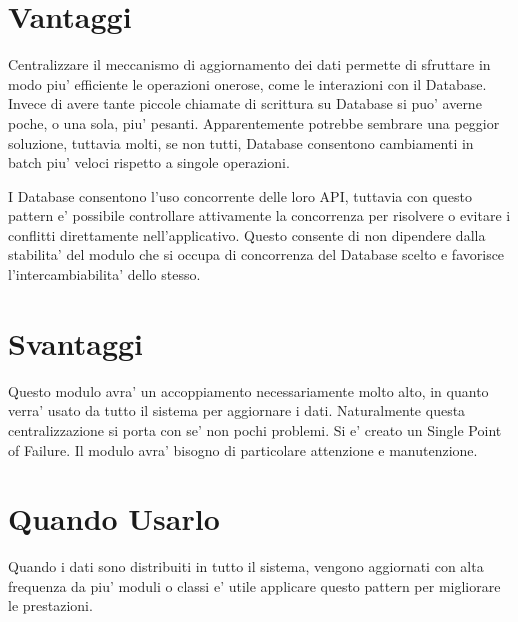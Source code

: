 \section{Vantaggi}

Centralizzare il meccanismo di aggiornamento dei dati permette di sfruttare in modo piu' efficiente le operazioni onerose, come le interazioni con il Database. Invece di avere tante piccole chiamate di scrittura su Database si puo' averne poche, o una sola, piu' pesanti. Apparentemente potrebbe sembrare una peggior soluzione, tuttavia molti, se non tutti, Database consentono cambiamenti in batch piu' veloci rispetto a singole operazioni.

I Database consentono l'uso concorrente delle loro API, tuttavia con questo pattern e' possibile controllare attivamente la concorrenza per risolvere o evitare i conflitti direttamente nell'applicativo. Questo consente di non dipendere dalla stabilita' del modulo che si occupa di concorrenza del Database scelto e favorisce l'intercambiabilita' dello stesso.

\section{Svantaggi}

Questo modulo avra' un accoppiamento necessariamente molto alto, in quanto verra' usato da tutto il sistema per aggiornare i dati. Naturalmente questa centralizzazione si porta con se' non pochi problemi. Si e' creato un Single Point of Failure. Il modulo avra' bisogno di particolare attenzione e manutenzione.

\section{Quando Usarlo}

Quando i dati sono distribuiti in tutto il sistema, vengono aggiornati con alta frequenza da piu' moduli o classi e' utile applicare questo pattern per migliorare le prestazioni.
